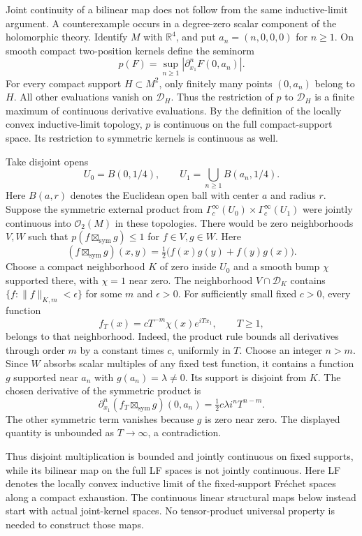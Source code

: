 Joint continuity of a bilinear map does not follow from the same
inductive-limit argument. A counterexample occurs in a degree-zero
scalar component of the holomorphic theory.
Identify $M$ with $\mathbb R^4$, and put
$a_n=(n,0,0,0)$ for $n\geq1$.
On smooth compact two-position kernels define the seminorm
\[
 p(F)=\sup_{n\geq1}
       |\partial_{x_1}^{n}F(0,a_n)|.
\]
For every compact support $H\subset M^2$, only finitely many points
$(0,a_n)$ belong to $H$. All other evaluations vanish on
$\mathscr D_H$. Thus the restriction of $p$ to $\mathscr D_H$ is a
finite maximum of continuous derivative evaluations.
By the definition of the locally convex inductive-limit topology, $p$
is continuous on the full compact-support space.
Its restriction to symmetric kernels is continuous as well.

Take disjoint opens
\[
 U_0=B(0,1/4),\qquad U_1=\bigcup_{n\geq1}B(a_n,1/4).
\]
Here $B(a,r)$ denotes the Euclidean open ball with center $a$ and radius $r$.
Suppose the symmetric external product from
$\Gamma_c^\infty(U_0)\times\Gamma_c^\infty(U_1)$ were jointly
continuous into $\mathscr O_2(M)$ in these topologies.
There would be zero neighborhoods $V,W$ such that
$p(f\boxtimes_{\mathrm{sym}}g)\leq1$ for $f\in V,g\in W$.
Here
\[
 (f\boxtimes_{\mathrm{sym}}g)(x,y)
 =\tfrac12\bigl(f(x)g(y)+f(y)g(x)\bigr).
\]
Choose a compact neighborhood $K$ of zero inside $U_0$ and a smooth
bump $\chi$ supported there, with $\chi=1$ near zero.
The neighborhood $V\cap\mathscr D_K$ contains
$\{f:\|f\|_{K,m}<\epsilon\}$ for some $m$ and $\epsilon>0$.
For sufficiently small fixed $c>0$, every function
\[
 f_T(x)=cT^{-m}\chi(x)e^{iTx_1},\qquad T\geq1,
\]
belongs to that neighborhood. Indeed, the product rule bounds all
derivatives through order $m$ by a constant times $c$, uniformly in $T$.
Choose an integer $n>m$.
Since $W$ absorbs scalar multiples of any fixed test function, it contains
a function $g$ supported near $a_n$ with $g(a_n)=\lambda\ne0$.
Its support is disjoint from $K$.
The chosen derivative of the symmetric product is
\[
 \partial_{x_1}^{n}
 (f_T\boxtimes_{\mathrm{sym}}g)(0,a_n)
 =\tfrac12 c\lambda i^nT^{n-m}.
\]
The other symmetric term vanishes because $g$ is zero near zero.
The displayed quantity is unbounded as $T\to\infty$, a contradiction.

Thus disjoint multiplication is bounded and jointly continuous on fixed
supports, while its bilinear map on the full LF spaces is not jointly
continuous. Here LF denotes the locally convex inductive limit of the
fixed-support Fr\'echet spaces along a compact exhaustion.
The continuous linear structural maps below instead start with actual
joint-kernel spaces. No tensor-product universal property is needed to
construct those maps.

